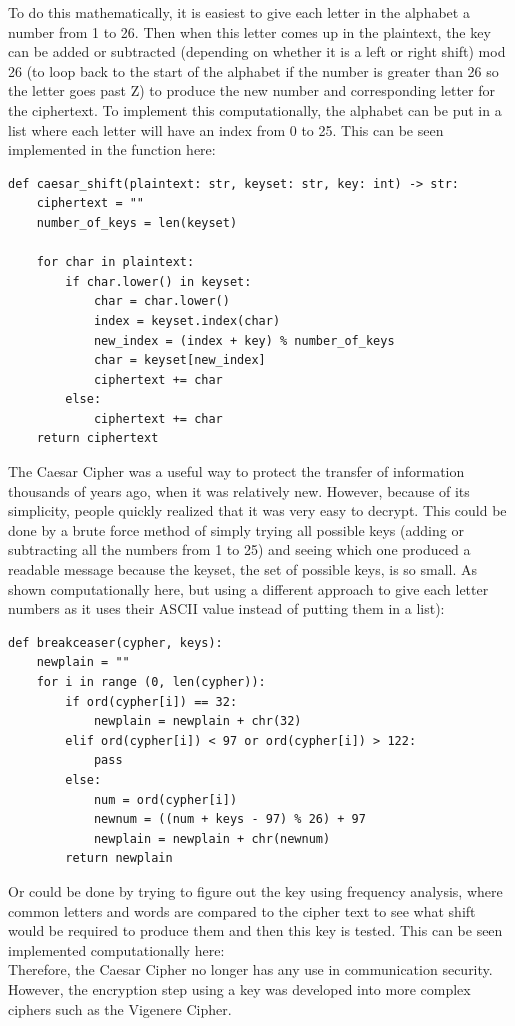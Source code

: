 \documentclass{article}
\begin{document}
To do this mathematically, it is easiest to give each letter in the alphabet a number from 1 to 26. Then when this letter comes up in the plaintext, the key can be added or subtracted (depending on whether it is a left or right shift) mod 26 (to loop back to the start of the alphabet if the number is greater than 26 so the letter goes past Z) to produce the new number and corresponding letter for the ciphertext. To implement this computationally, the alphabet can be put in a list where each letter will have an index from 0 to 25.
This can be seen implemented in the function here:
\medskip
\begin{lstlisting}
def caesar_shift(plaintext: str, keyset: str, key: int) -> str:
    ciphertext = ""
    number_of_keys = len(keyset)

    for char in plaintext:
        if char.lower() in keyset:
            char = char.lower()
            index = keyset.index(char)
            new_index = (index + key) % number_of_keys
            char = keyset[new_index]
            ciphertext += char
        else:
            ciphertext += char
    return ciphertext
\end{lstlisting}
\medskip

The Caesar Cipher was a useful way to protect the transfer of information thousands of years ago, when it was relatively new. However, because of its simplicity, people quickly realized that it was very easy to decrypt. This could be done by a brute force method of simply trying all possible keys (adding or subtracting all the numbers from 1 to 25) and seeing which one produced a readable message because the keyset, the set of possible keys, is so small. As shown computationally here, but using a different approach to give each letter numbers as it uses their ASCII value instead of putting them in a list):
\medskip
\begin{lstlisting}
def breakceaser(cypher, keys):
    newplain = ""
    for i in range (0, len(cypher)):
        if ord(cypher[i]) == 32:
            newplain = newplain + chr(32)
        elif ord(cypher[i]) < 97 or ord(cypher[i]) > 122:
            pass
        else:
            num = ord(cypher[i])
            newnum = ((num + keys - 97) % 26) + 97
            newplain = newplain + chr(newnum)
        return newplain      
\end{lstlisting}
Or could be done by trying to figure out the key using frequency analysis, where common letters and words are compared to the cipher text to see what shift would be required to produce them and then this key is tested. This can be seen implemented computationally here: %
\\
Therefore, the Caesar Cipher no longer has any use in communication security. However, the encryption step using a key was developed into more complex ciphers such as the Vigenere Cipher.
\end{document}
